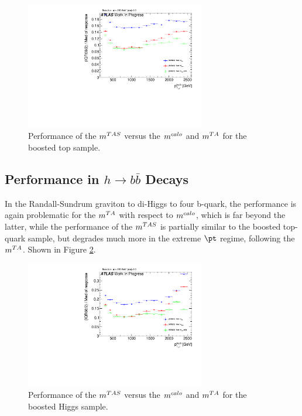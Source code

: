 \begin{figure}[!ht]
  \centering
      \includegraphics[width=0.7\textwidth]{jet_part/mtas/71graphcftr_h_JetRatio_mJ12CALOIQRoMTops.pdf}
  \caption[$\mtas$ for boosted tops]{Performance of the $\mtas$ versus the $m^{calo}$ and $m^{TA}$ for the boosted top sample.}
  \label{fig:mtas3}
\end{figure}
\subsection{Performance in $h\to b\bar{b}$ Decays}
In the Randall-Sundrum graviton to di-Higgs to four b-quark, the performance is again problematic for the $m^{TA}$ with respect to $m^{calo}$, which is far beyond the latter, while the performance of the $\mtas$ is partially similar to the boosted top-quark sample, but degrades much more in the extreme $\pt$ regime, following the $m^{TA}$. Shown in Figure \ref{fig:mtas4}.

\begin{figure}[!ht]
  \centering
      \includegraphics[width=0.7\textwidth]{jet_part/mtas/71graphcftr_h_JetRatio_mJ12CALOIQRoMHiggs.pdf}
  \caption[$\mtas$ for boosted Higgs]{Performance of the $\mtas$ versus the $m^{calo}$ and $m^{TA}$ for the boosted Higgs sample.}
  \label{fig:mtas4}
\end{figure}

